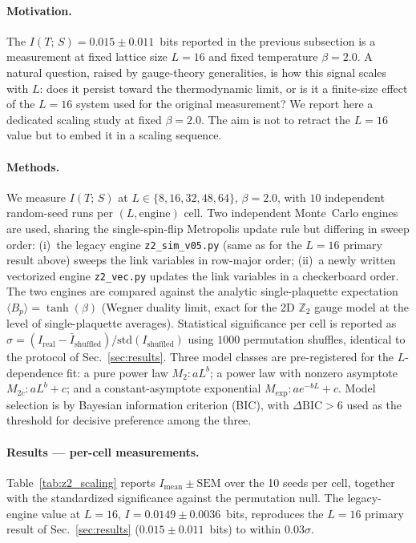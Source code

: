 \documentclass[aps,pra,twocolumn,superscriptaddress,showpacs,floatfix]{revtex4-2}
\newcommand{\Ztwo}{\mathbb{Z}_2}
\newcommand{\MI}{I(T;\,S)}
\begin{document}
\paragraph{Motivation.}
The $\MI = 0.015 \pm 0.011$~bits reported in the previous subsection is a
measurement at fixed lattice size $L=16$ and fixed temperature $\beta=2.0$.
A natural question, raised by gauge-theory generalities, is how this signal
scales with $L$: does it persist toward the thermodynamic limit, or is it a
finite-size effect of the $L=16$ system used for the original measurement? We
report here a dedicated scaling study at fixed $\beta=2.0$. The aim is not to
retract the $L=16$ value but to embed it in a scaling sequence.

\paragraph{Methods.}
We measure $\MI$ at $L \in \{8, 16, 32, 48, 64\}$, $\beta = 2.0$, with $10$
independent random-seed runs per $(L,\text{engine})$ cell. Two independent
Monte~Carlo engines are used, sharing the single-spin-flip Metropolis update
rule but differing in sweep order: (i)~the legacy engine
\texttt{z2\_sim\_v05.py} (same as for the $L=16$ primary result above)
sweeps the link variables in row-major order; (ii)~a newly written vectorized
engine \texttt{z2\_vec.py} updates the link variables in a checkerboard order.
The two engines are compared against the analytic single-plaquette expectation
$\langle B_p \rangle = \tanh(\beta)$ (Wegner duality limit, exact for the 2D
$\Ztwo$ gauge model at the level of single-plaquette averages). Statistical
significance per cell
is reported as $\sigma = (I_\mathrm{real} - \bar I_\mathrm{shuffled}) /
\mathrm{std}(I_\mathrm{shuffled})$ using $1000$ permutation shuffles, identical
to the protocol of Sec.~\ref{sec:results}. Three model classes are
pre-registered for the $L$-dependence fit: a pure power law $M_2 :
a L^{b}$; a power law with nonzero asymptote $M_{2c} : a L^{b} + c$; and a
constant-asymptote exponential $M_\mathrm{exp} : a e^{-b L} + c$. Model selection
is by Bayesian information criterion (BIC), with $\Delta\mathrm{BIC} > 6$ used
as the threshold for decisive preference among the three.

\paragraph{Results --- per-cell measurements.}
Table~\ref{tab:z2_scaling} reports $I_\mathrm{mean} \pm \mathrm{SEM}$ over the
10 seeds per cell, together with the standardized significance against the
permutation null. The legacy-engine value at $L=16$, $I = 0.0149 \pm 0.0036$~bits,
reproduces the $L=16$ primary result of Sec.~\ref{sec:results}
($0.015 \pm 0.011$~bits) to within $0.03\sigma$.
\end{document}

